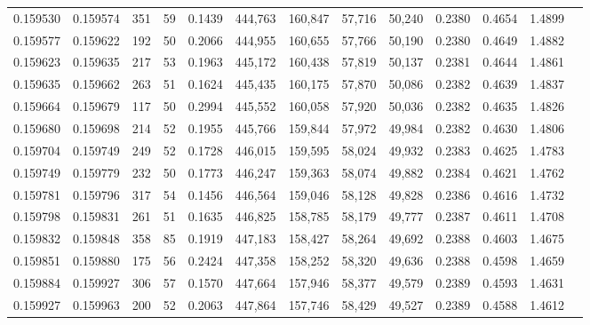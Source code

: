 \begin{tabular}{rrrrrrrrrrrrr}
0.159530 & 0.159574 &   351 &  59 &                                     0.1439 & 444,763 & 160,847 &  57,716 &  50,240 & 0.2380 & 0.4654 & 1.4899 \\
0.159577 & 0.159622 &   192 &  50 &                                     0.2066 & 444,955 & 160,655 &  57,766 &  50,190 & 0.2380 & 0.4649 & 1.4882 \\
0.159623 & 0.159635 &   217 &  53 &                                     0.1963 & 445,172 & 160,438 &  57,819 &  50,137 & 0.2381 & 0.4644 & 1.4861 \\
0.159635 & 0.159662 &   263 &  51 &                                     0.1624 & 445,435 & 160,175 &  57,870 &  50,086 & 0.2382 & 0.4639 & 1.4837 \\
0.159664 & 0.159679 &   117 &  50 &                                     0.2994 & 445,552 & 160,058 &  57,920 &  50,036 & 0.2382 & 0.4635 & 1.4826 \\
0.159680 & 0.159698 &   214 &  52 &                                     0.1955 & 445,766 & 159,844 &  57,972 &  49,984 & 0.2382 & 0.4630 & 1.4806 \\
0.159704 & 0.159749 &   249 &  52 &                                     0.1728 & 446,015 & 159,595 &  58,024 &  49,932 & 0.2383 & 0.4625 & 1.4783 \\
0.159749 & 0.159779 &   232 &  50 &                                     0.1773 & 446,247 & 159,363 &  58,074 &  49,882 & 0.2384 & 0.4621 & 1.4762 \\
0.159781 & 0.159796 &   317 &  54 &                                     0.1456 & 446,564 & 159,046 &  58,128 &  49,828 & 0.2386 & 0.4616 & 1.4732 \\
0.159798 & 0.159831 &   261 &  51 &                                     0.1635 & 446,825 & 158,785 &  58,179 &  49,777 & 0.2387 & 0.4611 & 1.4708 \\
0.159832 & 0.159848 &   358 &  85 &                                     0.1919 & 447,183 & 158,427 &  58,264 &  49,692 & 0.2388 & 0.4603 & 1.4675 \\
0.159851 & 0.159880 &   175 &  56 &                                     0.2424 & 447,358 & 158,252 &  58,320 &  49,636 & 0.2388 & 0.4598 & 1.4659 \\
0.159884 & 0.159927 &   306 &  57 &                                     0.1570 & 447,664 & 157,946 &  58,377 &  49,579 & 0.2389 & 0.4593 & 1.4631 \\
0.159927 & 0.159963 &   200 &  52 &                                     0.2063 & 447,864 & 157,746 &  58,429 &  49,527 & 0.2389 & 0.4588 & 1.4612 \\

\end{tabular}
